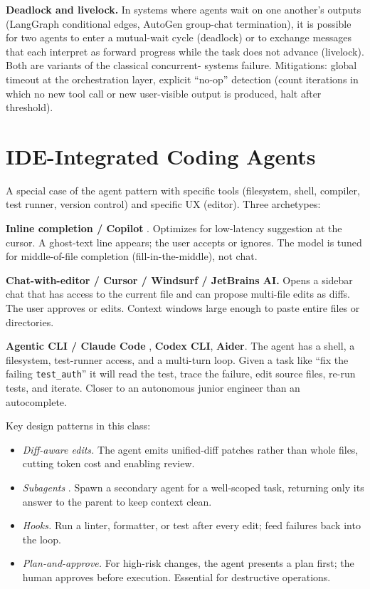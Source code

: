 \textbf{Deadlock and livelock.} In systems where agents wait on
one another's outputs (LangGraph conditional edges, AutoGen
group-chat termination), it is possible for two agents to enter
a mutual-wait cycle (deadlock) or to exchange messages that
each interpret as forward progress while the task does not
advance (livelock). Both are variants of the classical concurrent-
systems failure. Mitigations: global timeout at the orchestration
layer, explicit ``no-op'' detection (count iterations in which
no new tool call or new user-visible output is produced, halt
after threshold).

\section{IDE-Integrated Coding Agents}

A special case of the agent pattern with specific tools
(filesystem, shell, compiler, test runner, version control) and
specific UX (editor). Three archetypes:

\textbf{Inline completion / Copilot} \citep{github_copilot}.
Optimizes for low-latency suggestion at the cursor. A ghost-text
line appears; the user accepts or ignores. The model is tuned
for middle-of-file completion (fill-in-the-middle), not chat.

\textbf{Chat-with-editor / Cursor / Windsurf / JetBrains AI.}
Opens a sidebar chat that has access to the current file and can
propose multi-file edits as diffs. The user approves or edits.
Context windows large enough to paste entire files or directories.

\textbf{Agentic CLI / Claude Code} \citep{claude_code},
\textbf{Codex CLI}, \textbf{Aider}. The agent has a shell, a
filesystem, test-runner access, and a multi-turn loop. Given a
task like ``fix the failing \texttt{test\_auth}'' it will read
the test, trace the failure, edit source files, re-run tests,
and iterate. Closer to an autonomous junior engineer than an
autocomplete.

Key design patterns in this class:
\begin{itemize}
  \item \emph{Diff-aware edits.} The agent emits unified-diff
        patches rather than whole files, cutting token cost and
        enabling review.
  \item \emph{Subagents} \citep{claude_code}. Spawn a secondary
        agent for a well-scoped task, returning only its answer
        to the parent to keep context clean.
  \item \emph{Hooks.} Run a linter, formatter, or test after
        every edit; feed failures back into the loop.
  \item \emph{Plan-and-approve.} For high-risk changes, the
        agent presents a plan first; the human approves before
        execution. Essential for destructive operations.
\end{itemize}

